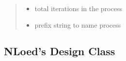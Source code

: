 \documentclass[letterpaper,10pt,english,openany,oneside]{sphinxmanual}
\begin{document}
\begin{fulllineitems}
\begin{fulllineitems}
\begin{quote}
\begin{description}
\begin{itemize}
\item {} 
 \textendash{} total iterations in the process

\item {} 
 \textendash{} prefix string to name process

\end{itemize}

\end{description}\end{quote}

\end{fulllineitems}


\end{fulllineitems}



\subsection{NLoed’s Design Class}
\label{\detokenize{nloed:module-nloed.design}}\label{\detokenize{nloed:nloed-s-design-class}}
\end{document}
